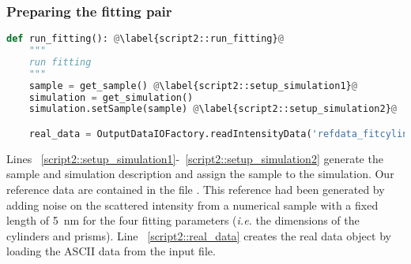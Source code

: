 \subsubsection*{Preparing the fitting pair}
\begin{lstlisting}[language=python, style=eclipseboxed, firstnumber=45]
def run_fitting(): @\label{script2::run_fitting}@
    """
    run fitting
    """
    sample = get_sample() @\label{script2::setup_simulation1}@
    simulation = get_simulation()
    simulation.setSample(sample) @\label{script2::setup_simulation2}@

    real_data = OutputDataIOFactory.readIntensityData('refdata_fitcylinderprisms.txt') @\label{script2::real_data}@
\end{lstlisting}
Lines
~\ref{script2::setup_simulation1}-~\ref{script2::setup_simulation2}
generate the 
sample and simulation description and assign the sample to the simulation.
Our reference data are contained in the file .
 This reference had been generated by adding noise
on the scattered intensity from a numerical sample with a fixed length of 5~nm for the four fitting
parameters (\textit{i.e.} the dimensions of the cylinders and prisms).
Line ~\ref{script2::real_data} creates the real data object by loading
the ASCII data from the input file.


